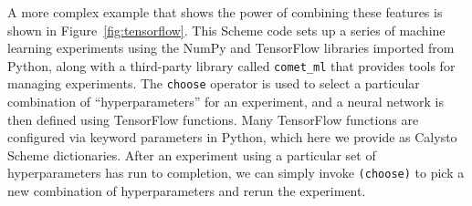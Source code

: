\documentclass[acmsmall,screen,nonacm]{acmart}
\begin{document}
\noindent
A more complex example that shows the power of combining these features is
shown in Figure~\ref{fig:tensorflow}. This Scheme code sets up a series of
machine learning experiments using the NumPy and TensorFlow libraries imported
from Python, along with a third-party library called \texttt{comet\_ml} that
provides tools for managing experiments.  The \texttt{choose} operator is used
to select a particular combination of ``hyperparameters'' for an experiment,
and a neural network is then defined using TensorFlow functions.  Many
TensorFlow functions are configured via keyword parameters in Python, which
here we provide as Calysto Scheme dictionaries.  After an experiment using a
particular set of hyperparameters has run to completion, we can simply invoke
\texttt{(choose)} to pick a new combination of hyperparameters and rerun the
experiment.

\end{document}
